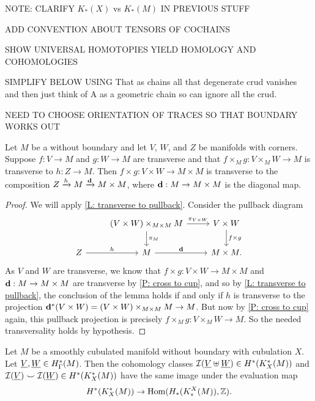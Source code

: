 \documentclass{amsart}
\begin{document}
 NOTE: CLARIFY $K_*(X)$ vs $K_*(M)$ IN PREVIOUS STUFF

ADD CONVENTION ABOUT TENSORS OF COCHAINS

SHOW UNIVERSAL HOMOTOPIES YIELD HOMOLOGY AND COHOMOLOGIES

SIMPLIFY BELOW USING That as chains all that degenerate crud vanishes and then just think of A as a geometric chain so can ignore all the crud.

NEED TO CHOOSE ORIENTATION OF TRACES SO THAT BOUNDARY WORKS OUT


\begin{lemma}\label{L: trans diag cube}
Let $M$ be a  without boundary and let $V$, $W$, and $Z$ be  manifolds with corners. Suppose $f:V\to M$ and $g:W\to M$ are transverse and that $f\times_Mg:V\times_MW\to M$ is transverse to $h:Z\to M$. Then $f\times g:V\times W\to M\times M$ is transverse to the composition $Z\xrightarrow{h}M\xrightarrow{\mathbf{d}}M\times M$, where $\mathbf{d}:M\to M\times M$ is the diagonal map.
\end{lemma}
\begin{proof}
We will apply \cref{L: transverse to pullback}. Consider the pullback diagram
	\[
	\begin{tikzcd}
		& (V \times W)\times_{M\times M} M \arrow[r, "\pi_{V\times W}"] \arrow[d, "\pi_M"] & V\times W \arrow[d, "f\times g"] \\
		Z \arrow[r, "h"] & M \arrow[r, "\diag"]&  M\times M.
	\end{tikzcd}
	\]
As $V$ and $W$ are transverse, we know that $f\times g:V\times W\to M\times M$ and $\mathbf{d}:M\to M\times M$ are transverse by \cref{P: cross to cup}, and so by \cref{L: transverse to pullback}, the conclusion of the lemma holds if and only if $h$ is transverse to the projection $\mathbf{d}^*(V\times W)=(V \times W)\times_{M\times M} M \to M$. But now by \cref{P: cross to cup} again, this pullback projection is precisely $f\times_Mg:V\times_MW\to M$. So the needed transversality holds by hypothesis.
\end{proof}



\begin{proposition}
Let $M$ be a smoothly cubulated manifold without boundary with cubulation $X$. Let $\underline{V},\underline{W}\in H^*_\Gamma(M)$. Then the cohomology classes $\mathcal{I}(\underline{V}\uplus\underline{W})\in H^*(K_X^*(M))$ and $\mathcal{I}(\underline{V}) \smile \mathcal{I}(\underline{W})\in H^*(K_X^*(M))$ have the same image under the evaluation map $$H^*(K_X^*(M))\to \textup{Hom}(H_*(K_*^X(M)),\mathbb{Z}).$$
\end{proposition}
\end{document}
